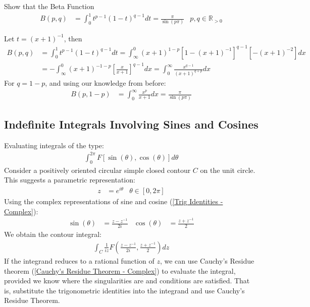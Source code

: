 \documentclass[12pt, english]{book}
\makeatletter
\renewenvironment{proof}[1][\proofname]{\par
	\pushQED{\qed}%
	\normalfont \topsep6\p@\@plus6\p@\relax
	\list{}{%
		\settowidth{\leftmargin}{\itshape\proofname:\hskip\labelsep}%
		\setlength{\labelwidth}{0pt}%
		\setlength{\itemindent}{-\leftmargin}%
		}%
	\item[\hskip\labelsep\itshape#1\@addpunct{:}]\ignorespaces
	}{\popQED\endlist\@endpefalse}
\makeatother
\begin{document}
	\begin{example}
		\label{Beta Function Example - Complex}
		Show that the Beta Function
		\begin{align*}
			B(p,q) &= \int_{0}^{1} t^{p-1} (1-t)^{q-1} dt = \frac{\pi}{\sin(p\pi)}
				& p,q \in \mathbb{R}_{>0}
		\end{align*}
		\begin{proof}
			{\color{Grey}
			Let \(t = (x+1)^{-1}\), then
			\begin{align*}
				B(p, q) 
				&= \int_{0}^{1} t^{p-1} (1-t)^{q-1} dt 
				 = \int_{\infty}^{0} (x+1)^{1-p} [1- (x+1)^{-1}]^{q-1} [-(x+1)^{-2}] dx  \\
				&= - \int_{\infty}^{0} (x+1)^{-1-p} \left[\frac{x}{x+1}\right]^{q-1} dx
				 = \int_{0}^{\infty} \frac{x^{q-1}}{(x+1)^{q+p}} dx
			\end{align*}
			For \(q = 1-p\), and using our knowledge from before:
			\begin{align*}
				B(p, 1-p) &= \int_{0}^{\infty} \frac{x^{p}}{x+1} dx = \frac{\pi}{\sin(p\pi)}
			\end{align*}
			}
		\end{proof}
	\end{example}
	
	\subsection{Indefinite Integrals Involving Sines and Cosines} \label{Indefinite Integrals Involving Sines and Cosines Subsection - Complex}
	
	Evaluating integrals of the type:
	\begin{align*}
		\int_{0}^{2\pi} F[\sin(\theta), \cos(\theta)] d\theta
	\end{align*}
	Consider a positively oriented circular simple closed contour \(C\) on the unit circle. This suggests a parametric representation:
	\begin{align*}
		z &= e^{i\theta}	& \theta \in [0, 2\pi]
	\end{align*}
	Using the complex representations of sine and cosine (\cref{Trig Identities - Complex}):
	\begin{align*}
		\sin(\theta) &= \frac{z - z^{-1}}{2i} &
		\cos(\theta) &= \frac{z + z^{-1}}{2}
	\end{align*}
	We obtain the contour integral:
	\begin{align*}
		\int_{C} \frac{1}{iz} F\left( \frac{z-z^{-1}}{2i}, \frac{z+z^{-1}}{2}\right) dz
	\end{align*}
	If the integrand reduces to a rational function of \(z\), we can use Cauchy's Residue theorem (\cref{Cauchy's Residue Theorem - Complex}) to evaluate the integral, provided we know where the singularities are and conditions are satisfied. That is, substitute the trigonometric identities into the integrand and use Cauchy's Residue Theorem.
	
\end{document}
